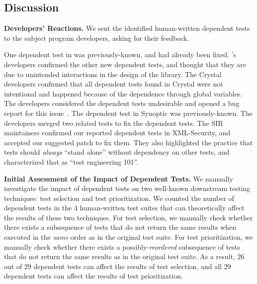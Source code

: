 \subsection{Discussion}
\label{sec:expdiscussion}


\noindent \textbf{Developers' Reactions.}
We sent the identified human-written dependent tests to the
subject program developers, asking for their feedback.

One dependent test in \jt was previously-known,
and had already been fixed. \jt's
developers confirmed the other new dependent
tests, and thought that they are due to unintended interactions
in the design of the library.
%
The Crystal developers confirmed that all dependent tests
found in Crystal were not intentional and 
happened because of the dependence
through global variables. The developers considered the
dependent tests undesirable and opened a bug report for
this issue~\cite{crystalbugreport}.
%
The dependent test in Synoptic was previously-known.
The developers merged two related tests to fix
the dependent tests.
%
The SIR~\cite{sir} maintainers confirmed our reported dependent
tests in XML-Security, and accepted our
suggested patch to fix them. They also highlighted the practice
that tests should \textit{always} ``stand alone''
without dependency on other tests, and characterized that as
``test engineering 101''. 

\vspace{1mm}
\noindent \textbf{Initial Assessment of the Impact of
Dependent Tests.} We manually investigate the
impact of dependent tests on two well-known
downstream testing techniques: test
selection and test prioritization.
We counted the number of dependent tests in the
4 human-written test suites that can
theoretically affect the results of these two techniques.
For test selection, we manually check whether
there exists a subsequence of tests
that do not return the same results
when executed in the \textit{same} order
as in the original test suite. 
For test prioritization, we manually check whether
there exists a possibly-\textit{reordered}
subsequence of tests that do not return the
same results as in the original test suite.
As a result, 26 out of 29 dependent tests can
affect the results of test selection,
and all 29 dependent tests can affect the results
of test prioritization.

